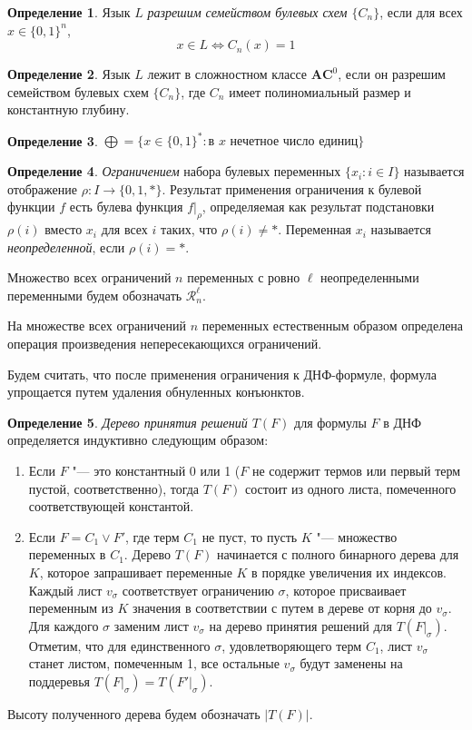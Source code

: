 \documentclass[12pt]{article}
\theoremstyle{plain}
\theoremstyle{remark}
\theoremstyle{definition}
\newtheorem{definition}{Определение}
\begin{document}
\begin{definition}
Язык $L$ \emph{разрешим семейством булевых схем $\{C_n\}$}, если для всех $x \in \{0, 1\}^n$, 
\[x \in L \Leftrightarrow C_n(x) = 1\]
\end{definition}

\begin{definition}
Язык $L$ лежит в сложностном классе $\mathbf{AC}^0$, если он разрешим семейством булевых схем $\{C_n\}$, где $C_n$ имеет полиномиальный размер и константную глубину.
\end{definition}

\begin{definition}
$\bigoplus = \{x \in \{0, 1\}^* : \text{в } x \text{ нечетное число единиц} \}  $
\end{definition}

\begin{definition}
\emph{Ограничением} набора булевых переменных $\{x_i : i \in I \}$ называется отображение $\rho : I \to \{0, 1, *\}$. Результат применения ограничения к булевой функции $f$ есть булева функция $f|_\rho$, определяемая как результат подстановки $\rho(i)$ вместо $x_i$ для всех $i$ таких, что $\rho(i) \ne *$. Переменная $x_i$ называется \emph{неопределенной}, если $\rho(i) = *$.

Множество всех ограничений $n$  переменных с ровно $\ell$ неопределенными переменными будем обозначать $\mathcal{R}_n^\ell$.

На множестве всех ограничений $n$ переменных естественным образом определена операция произведения непересекающихся ограничений.

Будем считать, что после применения ограничения к ДНФ-формуле, формула упрощается путем удаления обнуленных конъюнктов.

\end{definition}

\begin{definition}
\emph{Дерево принятия решений $T(F)$} для формулы $F$ в ДНФ определяется индуктивно следующим образом:
\begin{enumerate} 
\item Если $F$ "--- это константный 0 или 1 ($F$ не содержит термов или первый терм пустой, соответственно), тогда $T(F)$ состоит из одного листа, помеченного соответствующей константой.
\item Если $F = C_1 \vee F'$, где терм $C_1$ не пуст, то пусть $K$ "--- множество переменных в $C_1$. Дерево $T(F)$ начинается с полного бинарного дерева для $K$, которое запрашивает переменные $K$ в порядке увеличения их индексов. Каждый лист $v_\sigma$ соответствует ограничению $\sigma$, которое присваивает переменным из $K$ значения в соответствии с путем в дереве от корня до $v_\sigma$. Для каждого $\sigma$ заменим лист $v_\sigma$ на дерево принятия решений для  $T(F|_\sigma)$. \\
Отметим, что для единственного $\sigma$, удовлетворяющего терм $C_1$, лист $v_\sigma$ станет листом, помеченным 1, все остальные $v_\sigma$ будут заменены на поддеревья $T(F|_\sigma) = T(F'|_\sigma)$.
\end{enumerate}
Высоту полученного дерева будем обозначать $|T(F)|$.
\end{definition}
\end{document}
